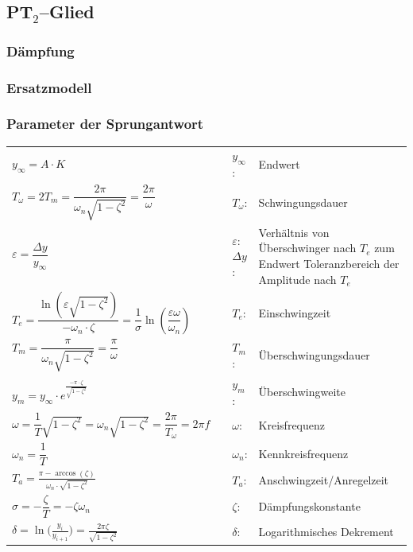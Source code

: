\subsection{PT\(_2\)--Glied}
\subsubsection{D\"ampfung}
\subsubsection{Ersatzmodell}

\subsubsection{Parameter der Sprungantwort}
\renewcommand{\arraystretch}{1.8}
\begin{tabular}{|m{7cm}|m{1cm}m{0.5cm}m{8cm}}
  \cline{1-1}
  $y_{\infty} =A \cdot K$ & &
  $y_{\infty}$: & Endwert\\
  \cline{1-1}  
	$T_\omega = 2T_m=\dfrac{2\pi}{\omega_n \sqrt{1-\zeta^2}}=\dfrac{2\pi}{\omega}$ & &
	$T_{\omega}$: & Schwingungsdauer \\
  \cline{1-1}
	$\varepsilon = \dfrac{\Delta y}{y_{\infty}}$ & &
	\parbox{0.5cm}{
		$\varepsilon$:\\
		$\Delta y$:
	} & 
	\parbox{8cm}{
		Verhältnis von Überschwinger nach $T_e$ zum Endwert\\
		Toleranzbereich der Amplitude nach $T_e$
	}\\
	$T_e = \dfrac{\ln\left(\varepsilon\sqrt{1-\zeta^2}\right)}{-\omega_n\cdot\zeta} = 
	\dfrac{1}{\sigma}\ln\left(\dfrac{\varepsilon\omega}{\omega_n}\right)$ & &
	$T_e$: & Einschwingzeit \\
	$T_m = \dfrac{\pi}{\omega_n\sqrt{1-\zeta^2}}=\dfrac{\pi}{\omega}$ & &
	$T_m$: & Überschwingungsdauer\\
	$y_m = y_{\infty} \cdot e^{\frac{-\pi\cdot\zeta}{\sqrt{1-\zeta^2}}}$ & &
	$y_m$: & Überschwingweite\\
	$\omega = \dfrac{1}{T}\sqrt{1-\zeta^2}= \omega_n\sqrt{1-\zeta^2}=\dfrac{2\pi}{T_\omega}=2\pi f$ & &
	$\omega$: & Kreisfrequenz \\
	$\omega_n = \dfrac{1}{T}$ & &
	$\omega_n$: & Kennkreisfrequenz \\
	$T_a = \frac{\pi - \arccos{(\zeta)}}{\omega_n\cdot\sqrt{1-\zeta^2}}$ & &
	$T_a$: & Anschwingzeit/Anregelzeit \\
	$\sigma = -\dfrac{\zeta}{T} = -\zeta\omega_n$ & &
	$\zeta$: & Dämpfungskonstante \\
	$\delta = \ln{\Big(\frac{y_i}{y_{i+1}}\Big)} = \frac{2\pi \zeta}{\sqrt{1-\zeta^2}}$ & &
	$\delta$: & Logarithmisches Dekrement\\
\end{tabular}
\renewcommand{\arraystretch}{1}
	
